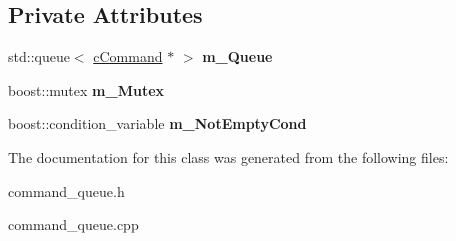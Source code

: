 \subsection*{\-Private \-Attributes}
\begin{DoxyCompactItemize}
\item 
\hypertarget{classengine_1_1cCommandQueue_acab17ed41f5114d5baaf14a6f8641e96}{
std\-::queue$<$ \hyperlink{classengine_1_1cCommand}{c\-Command} $\ast$ $>$ {\bfseries m\-\_\-\-Queue}}
\label{classengine_1_1cCommandQueue_acab17ed41f5114d5baaf14a6f8641e96}

\item 
\hypertarget{classengine_1_1cCommandQueue_a3382d012fe90188199630bef438d7901}{
boost\-::mutex {\bfseries m\-\_\-\-Mutex}}
\label{classengine_1_1cCommandQueue_a3382d012fe90188199630bef438d7901}

\item 
\hypertarget{classengine_1_1cCommandQueue_a7edc3ed909364aca4956ff6b8d95b912}{
boost\-::condition\-\_\-variable {\bfseries m\-\_\-\-Not\-Empty\-Cond}}
\label{classengine_1_1cCommandQueue_a7edc3ed909364aca4956ff6b8d95b912}

\end{DoxyCompactItemize}


\-The documentation for this class was generated from the following files\-:\begin{DoxyCompactItemize}
\item 
command\-\_\-queue.\-h\item 
command\-\_\-queue.\-cpp\end{DoxyCompactItemize}
